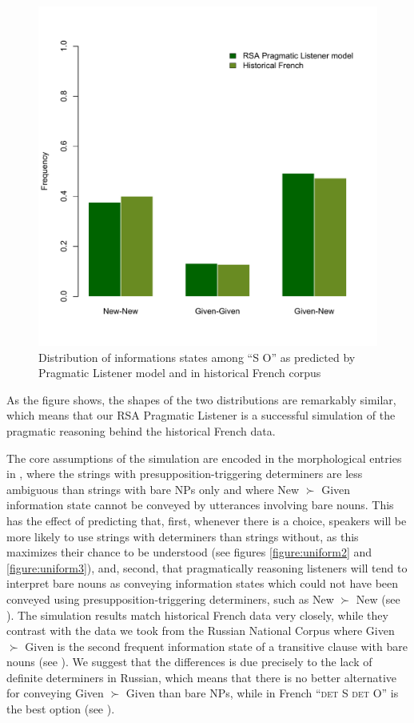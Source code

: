 \documentclass[output=paper,modfonts,nonflat]{langsci/langscibook}
\begin{document}
\begin{figure}
\includegraphics[scale = 0.45]{figures/plotModelComparison}
\caption{Distribution of informations states among ``S O'' as predicted by Pragmatic Listener model and in historical French corpus}\label{figure:models}
\end{figure}

As the figure shows, the shapes of the two distributions are remarkably similar, which means that our RSA Pragmatic Listener is a successful simulation of the pragmatic reasoning behind the historical French data. 

The core assumptions of the simulation are encoded in the morphological entries in , where the strings with presupposition-triggering determiners are less ambiguous than strings with bare NPs only and where New $\succ$ Given information state cannot be conveyed by utterances involving bare nouns. This has the effect of predicting that, first, whenever there is a choice, speakers will be more likely to use strings with determiners than strings without, as this maximizes their chance to be understood (see figures \ref{figure:uniform2} and \ref{figure:uniform3}), and, second, that pragmatically reasoning listeners will tend to interpret bare nouns as conveying information states which could not have been conveyed using presupposition-triggering determiners, such as New $\succ$ New (see ). The simulation results match historical French data very closely, while they contrast with the data we took from the Russian National Corpus where Given $\succ$ Given is the second frequent information state of a transitive clause with bare nouns (see ). We suggest that the differences is due precisely to the lack of definite determiners in Russian, which means that there is no better alternative for conveying Given $\succ$ Given than bare NPs, while in French ``{\scshape det} S {\scshape det} O'' is the best option (see ). 
\end{document}
